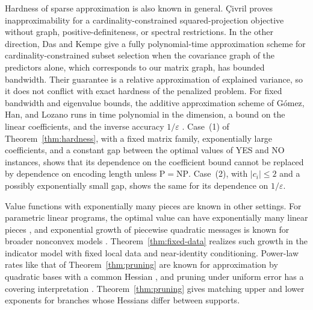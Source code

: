 Hardness of sparse approximation is also known in general. \c{C}ivril
\cite[Theorem~1.1]{Civril} proves inapproximability for a
cardinality-constrained squared-projection objective without graph,
positive-definiteness, or spectral restrictions. In the other direction,
Das and Kempe \cite[Theorem~4.1]{DasKempe} give a fully polynomial-time
approximation scheme for cardinality-constrained subset selection when
the covariance graph of the predictors alone, which corresponds to our
matrix graph, has bounded bandwidth. Their guarantee is a relative
approximation of explained variance, so it does not conflict with exact
hardness of the penalized problem. For fixed bandwidth and eigenvalue
bounds, the additive approximation scheme of G\'omez, Han, and Lozano
runs in time polynomial in the dimension, a bound on the linear
coefficients, and the inverse accuracy $1/\varepsilon$
\cite[Theorem~1]{GomezBanded}. Case~(1) of Theorem~\ref{thm:hardness},
with a fixed matrix family, exponentially large coefficients, and a
constant gap between the optimal values of YES and NO instances, shows
that its dependence on the coefficient bound cannot be replaced by
dependence on encoding length unless $\mathrm{P}=\mathrm{NP}$.
Case~(2), with $|c_i|\le2$ and a possibly exponentially small gap,
shows the same for its dependence on $1/\varepsilon$.

Value functions with exponentially many pieces are known in other
settings. For parametric linear programs, the optimal value can have
exponentially many linear pieces \cite[Corollary~1]{Murty}, and
exponential growth of piecewise quadratic messages is known for broader
nonconvex models \cite[Section~5]{KuricTree}.
Theorem~\ref{thm:fixed-data} realizes such growth in the indicator model
with fixed local data and near-identity conditioning. Power-law rates
like that of Theorem~\ref{thm:pruning} are known for approximation by
quadratic bases with a common Hessian \cite[Section~III,
Theorem~3.3]{GaubertPruning}, and pruning under uniform error has a
covering interpretation \cite[Section~VI]{GaubertPruning}.
Theorem~\ref{thm:pruning} gives matching upper and lower exponents for
branches whose Hessians differ between supports.
